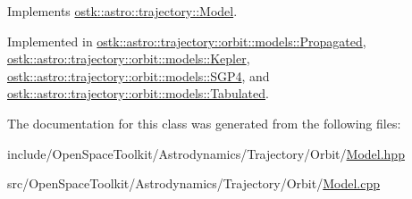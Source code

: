 Implements \hyperlink{classostk_1_1astro_1_1trajectory_1_1_model_a4b2098483430a820481ed50b81656e31}{ostk\+::astro\+::trajectory\+::\+Model}.



Implemented in \hyperlink{classostk_1_1astro_1_1trajectory_1_1orbit_1_1models_1_1_propagated_a2b8aa6ff5511dbe92e6a3e7f4dd6880b}{ostk\+::astro\+::trajectory\+::orbit\+::models\+::\+Propagated}, \hyperlink{classostk_1_1astro_1_1trajectory_1_1orbit_1_1models_1_1_kepler_a9c71803234f356ade03453e3ae19ae94}{ostk\+::astro\+::trajectory\+::orbit\+::models\+::\+Kepler}, \hyperlink{classostk_1_1astro_1_1trajectory_1_1orbit_1_1models_1_1_s_g_p4_a12416476201382c3d1e3c620f7be106a}{ostk\+::astro\+::trajectory\+::orbit\+::models\+::\+S\+G\+P4}, and \hyperlink{classostk_1_1astro_1_1trajectory_1_1orbit_1_1models_1_1_tabulated_a66be3f1f23a464c666c38a3adcc3bab5}{ostk\+::astro\+::trajectory\+::orbit\+::models\+::\+Tabulated}.



The documentation for this class was generated from the following files\+:\begin{DoxyCompactItemize}
\item 
include/\+Open\+Space\+Toolkit/\+Astrodynamics/\+Trajectory/\+Orbit/\hyperlink{_trajectory_2_orbit_2_model_8hpp}{Model.\+hpp}\item 
src/\+Open\+Space\+Toolkit/\+Astrodynamics/\+Trajectory/\+Orbit/\hyperlink{_trajectory_2_orbit_2_model_8cpp}{Model.\+cpp}\end{DoxyCompactItemize}
